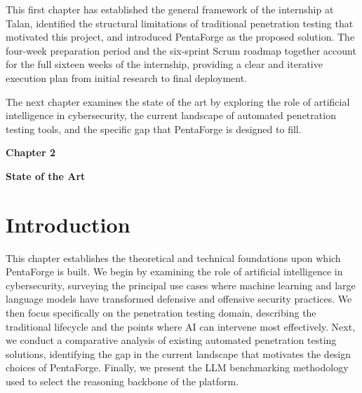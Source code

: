 \documentclass[12pt,a4paper]{report}
\begin{document}
This first chapter has established the general framework of the internship at Talan,
identified the structural limitations of traditional penetration testing that motivated
this project, and introduced PentaForge as the proposed solution. The four-week
preparation period and the six-sprint Scrum roadmap together account for the full
sixteen weeks of the internship, providing a clear and iterative execution plan from
initial research to final deployment.

The next chapter examines the state of the art by exploring the role of artificial
intelligence in cybersecurity, the current landscape of automated penetration testing
tools, and the specific gap that PentaForge is designed to fill.
\pagestyle{fancy}
\newpage
\pagestyle{chaptertwo}

\vspace*{4cm}

{\fontsize{26}{30}\selectfont \textbf{Chapter 2}}\par

\vspace{1cm}

{\LARGE\bfseries State of the Art}

\vspace{0.8cm}

\setcounter{chapter}{2}
\setcounter{section}{0}
\setcounter{table}{0}
\setcounter{figure}{0}

\section{Introduction}

This chapter establishes the theoretical and technical foundations upon which
PentaForge is built. We begin by examining the role of artificial intelligence
in cybersecurity, surveying the principal use cases where machine learning and
large language models have transformed defensive and offensive security practices.
We then focus specifically on the penetration testing domain, describing the
traditional lifecycle and the points where AI can intervene most effectively.
Next, we conduct a comparative analysis of existing automated penetration
testing solutions, identifying the gap in the current landscape that motivates
the design choices of PentaForge. Finally, we present the LLM benchmarking
methodology used to select the reasoning backbone of the platform.
\end{document}
